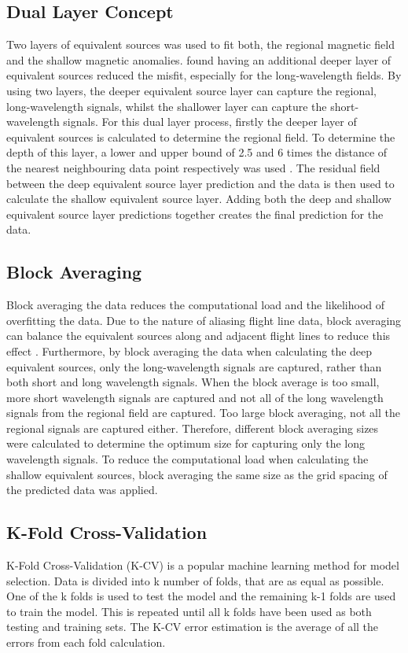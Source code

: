 \subsection{Dual Layer Concept}
Two layers of equivalent sources was used to fit both, the regional magnetic field and the shallow magnetic anomalies. \cite{Li2019} found having an additional deeper layer of equivalent sources reduced the misfit, especially for the long‐wavelength fields. By using two layers, the deeper equivalent source layer can capture the regional, long-wavelength signals, whilst the shallower layer can capture the short-wavelength signals. For this dual layer process, firstly the deeper layer of equivalent sources is calculated to determine the regional field. To determine the depth of this layer, a lower and upper bound of 2.5 and 6 times the distance of the nearest neighbouring data point respectively was used \cite{Dampney1969}. The residual field between the deep equivalent source layer prediction and the data is then used to calculate the shallow equivalent source layer. Adding both the deep and shallow equivalent source layer predictions together creates the final prediction for the data.

\subsection{Block Averaging}
Block averaging the data reduces the computational load and the likelihood of overfitting the data. Due to the nature of aliasing flight line data, block averaging can balance the equivalent sources along and adjacent flight lines to reduce this effect \cite{SolerUieda2021}. Furthermore, by block averaging the data when calculating the deep equivalent sources, only the long-wavelength signals are captured, rather than both short and long wavelength signals. When the block average is too small, more short wavelength signals are captured and not all of the long wavelength signals from the regional field are captured. Too large block averaging, not all the regional signals are captured either. Therefore, different block averaging sizes were calculated to determine the optimum size for capturing only the long wavelength signals. To reduce the computational load when calculating the shallow equivalent sources, block averaging the same size as the grid spacing of the predicted data was applied.

\subsection{K-Fold Cross-Validation}
K-Fold Cross-Validation (K-CV) is a popular machine learning method for model selection. Data is divided into k number of folds, that are as equal as possible. One of the k folds is used to test the model and the remaining k-1 folds are used to train the model. This is repeated until all k folds have been used as both testing and training sets. The K-CV error estimation is the average of all the errors from each fold calculation.

